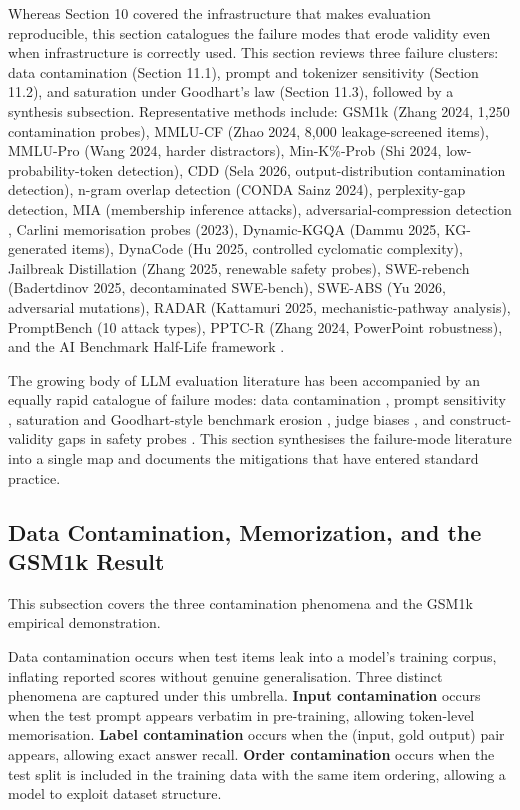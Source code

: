 \documentclass{article}
\begin{document}
Whereas Section 10 covered the infrastructure that makes evaluation reproducible, this section catalogues the failure modes that erode validity even when infrastructure is correctly used. This section reviews three failure clusters: data contamination (Section 11.1), prompt and tokenizer sensitivity (Section 11.2), and saturation under Goodhart's law (Section 11.3), followed by a synthesis subsection. Representative methods include: GSM1k (Zhang 2024, 1,250 contamination probes), MMLU-CF (Zhao 2024, 8,000 leakage-screened items), MMLU-Pro (Wang 2024, harder distractors), Min-K\%-Prob (Shi 2024, low-probability-token detection), CDD (Sela 2026, output-distribution contamination detection), n-gram overlap detection (CONDA Sainz 2024), perplexity-gap detection, MIA (membership inference attacks), adversarial-compression detection \citep{schwarzschild20242024}, Carlini memorisation probes (2023), Dynamic-KGQA (Dammu 2025, KG-generated items), DynaCode (Hu 2025, controlled cyclomatic complexity), Jailbreak Distillation (Zhang 2025, renewable safety probes), SWE-rebench (Badertdinov 2025, decontaminated SWE-bench), SWE-ABS (Yu 2026, adversarial mutations), RADAR (Kattamuri 2025, mechanistic-pathway analysis), PromptBench (10 attack types), PPTC-R (Zhang 2024, PowerPoint robustness), and the AI Benchmark Half-Life framework \citep{white20242024}.

The growing body of LLM evaluation literature has been accompanied by an equally rapid catalogue of failure modes: data contamination \cite{sainz20242024}, prompt sensitivity \cite{biderman20242024}, saturation and Goodhart-style benchmark erosion \cite{white20242024}, judge biases \cite{gu20242024}, and construct-validity gaps in safety probes \cite{yang20242024}. This section synthesises the failure-mode literature into a single map and documents the mitigations that have entered standard practice.

\subsection{Data Contamination, Memorization, and the GSM1k Result}\label{data-contamination-memorization-and-the-gsm1k-result}

This subsection covers the three contamination phenomena and the GSM1k empirical demonstration.

Data contamination occurs when test items leak into a model's training corpus, inflating reported scores without genuine generalisation. Three distinct phenomena are captured under this umbrella. \textbf{Input contamination} occurs when the test prompt appears verbatim in pre-training, allowing token-level memorisation. \textbf{Label contamination} occurs when the (input, gold output) pair appears, allowing exact answer recall. \textbf{Order contamination} occurs when the test split is included in the training data with the same item ordering, allowing a model to exploit dataset structure.
\end{document}
